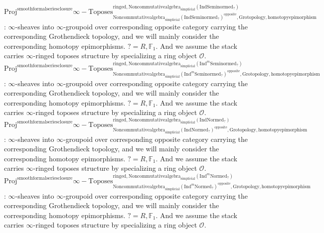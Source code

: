 \documentclass[11pt]{book}
\theoremstyle{definition}
\numberwithin{equation}{section}
\begin{document}
 
 \noindent $\mathrm{Proj}^\text{smoothformalseriesclosure}\infty-\mathrm{Toposes}^{\mathrm{ringed},\mathrm{Noncommutativealgebra}_{\mathrm{simplicial}}(\mathrm{Ind}\mathrm{Seminormed}_?)}_{\mathrm{Noncommutativealgebra}_{\mathrm{simplicial}}(\mathrm{Ind}\mathrm{Seminormed}_?)^\mathrm{opposite},\mathrm{Grotopology,homotopyepimorphism}}$: $\infty$-sheaves into $\infty$-groupoid over corresponding opposite category carrying the corresponding Grothendieck topology, and we will mainly consider the corresponding homotopy epimorphisms. $?=R,\mathbb{F}_1$. And we assume the stack carries $\infty$-ringed toposes structure by specializing a ring object $\mathcal{O}$. \\
\noindent $\mathrm{Proj}^\text{smoothformalseriesclosure}\infty-\mathrm{Toposes}^{\mathrm{ringed},\mathrm{Noncommutativealgebra}_{\mathrm{simplicial}}(\mathrm{Ind}^m\mathrm{Seminormed}_?)}_{\mathrm{Noncommutativealgebra}_{\mathrm{simplicial}}(\mathrm{Ind}^m\mathrm{Seminormed}_?)^\mathrm{opposite},\mathrm{Grotopology,homotopyepimorphism}}$: $\infty$-sheaves into $\infty$-groupoid over corresponding opposite category carrying the corresponding Grothendieck topology, and we will mainly consider the corresponding homotopy epimorphisms. $?=R,\mathbb{F}_1$. And we assume the stack carries $\infty$-ringed toposes structure by specializing a ring object $\mathcal{O}$.\\
\noindent $\mathrm{Proj}^\text{smoothformalseriesclosure}\infty-\mathrm{Toposes}^{\mathrm{ringed},\mathrm{Noncommutativealgebra}_{\mathrm{simplicial}}(\mathrm{Ind}\mathrm{Normed}_?)}_{\mathrm{Noncommutativealgebra}_{\mathrm{simplicial}}(\mathrm{Ind}\mathrm{Normed}_?)^\mathrm{opposite},\mathrm{Grotopology,homotopyepimorphism}}$: $\infty$-sheaves into $\infty$-groupoid over corresponding opposite category carrying the corresponding Grothendieck topology, and we will mainly consider the corresponding homotopy epimorphisms. $?=R,\mathbb{F}_1$. And we assume the stack carries $\infty$-ringed toposes structure by specializing a ring object $\mathcal{O}$.\\
\noindent $\mathrm{Proj}^\text{smoothformalseriesclosure}\infty-\mathrm{Toposes}^{\mathrm{ringed},\mathrm{Noncommutativealgebra}_{\mathrm{simplicial}}(\mathrm{Ind}^m\mathrm{Normed}_?)}_{\mathrm{Noncommutativealgebra}_{\mathrm{simplicial}}(\mathrm{Ind}^m\mathrm{Normed}_?)^\mathrm{opposite},\mathrm{Grotopology,homotopyepimorphism}}$: $\infty$-sheaves into $\infty$-groupoid over corresponding opposite category carrying the corresponding Grothendieck topology, and we will mainly consider the corresponding homotopy epimorphisms. $?=R,\mathbb{F}_1$. And we assume the stack carries $\infty$-ringed toposes structure by specializing a ring object $\mathcal{O}$.\\
\end{document}
